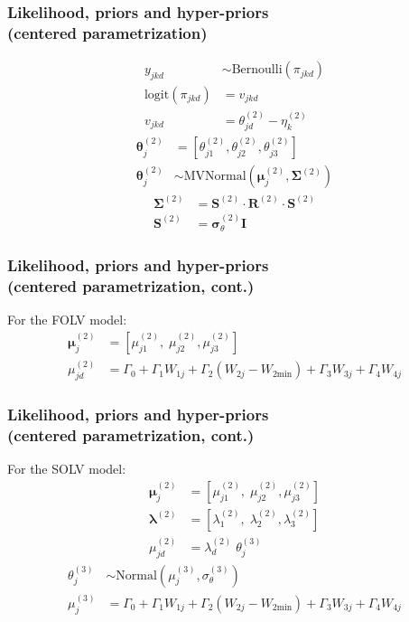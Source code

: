 \documentclass[nonav,sleutel]{beamer}
\begin{document}
	\begin{frame}
		\frametitle{Likelihood, priors and hyper-priors \\
			(centered parametrization)}
		\begin{align}
			y_{jkd} &\sim \text{Bernoulli}( \pi_{jkd} ) \\
			\text{logit}( \pi_{jkd} ) &= v_{jkd} \\
			v_{jkd} &= \theta^{(2)}_{jd} - \eta^{(2)}_{k}
		\end{align}
		\begin{align}
			\boldsymbol{\theta}^{(2)}_{j} &= \left[ \theta_{j1}^{(2)}, \theta_{j2}^{(2)}, \theta_{j3}^{(2)} \right] \\
			\boldsymbol{\theta}^{(2)}_{j} &\sim \text{MVNormal} \left( \boldsymbol{\mu}^{(2)}_{j}, \boldsymbol{\Sigma}^{(2)} \right) \label{eq:theta_sub}
		\end{align}
		\begin{align} \label{eq:sigma_factoring}
			\boldsymbol{\Sigma}^{(2)} &= \boldsymbol{S}^{(2)} \cdot \boldsymbol{R}^{(2)} \cdot \boldsymbol{S}^{(2)} \\
			\boldsymbol{S}^{(2)} &= \pmb{\sigma}^{(2)}_{\theta} \mathbf{I}
		\end{align}
	\end{frame}
	\begin{frame}
		\frametitle{Likelihood, priors and hyper-priors \\
			(centered parametrization, cont.)}
		For the FOLV model:
		\begin{align}
			\boldsymbol{\mu}^{(2)}_{j} &= \left[ \mu^{(2)}_{j1}, \; \mu^{(2)}_{j2}, \mu^{(2)}_{j3} \right] \label{eq:mu_FOLV} \\
			\mu^{(2)}_{jd} &= \Gamma_{0} + \Gamma_{1} W_{1j} + \Gamma_{2} (W_{2j} - W_{2\text{min}}) + \Gamma_{3} W_{3j} + \Gamma_{4} W_{4j}
		\end{align}
	\end{frame}
	\begin{frame}
		\frametitle{Likelihood, priors and hyper-priors \\
			(centered parametrization, cont.)}
		For the SOLV model:
		\begin{align}
			\boldsymbol{\mu}^{(2)}_{j} &= \left[ \mu^{(2)}_{j1}, \; \mu^{(2)}_{j2}, \mu^{(2)}_{j3} \right] \\
			\pmb{\lambda}^{(2)} &= \left[ \lambda^{(2)}_{1}, \; \lambda^{(2)}_{2}, \lambda^{(2)}_{3} \right] \\
			\mu^{(2)}_{jd} &= \lambda^{(2)}_{d} \; \theta^{(3)}_{j} 
		\end{align}
		\begin{align}
			\theta^{(3)}_{j} &\sim \text{Normal} \left( \mu^{(3)}_{j}, \sigma^{(3)}_{\theta} \right) \label{eq:theta} \\
			\mu^{(3)}_{j} &=  \Gamma_{0} + \Gamma_{1} W_{1j} + \Gamma_{2} (W_{2j} - W_{2\text{min}}) + \Gamma_{3} W_{3j} + \Gamma_{4} W_{4j} \label{eq:mu_SOLV}
		\end{align}
	\end{frame}
\end{document}
